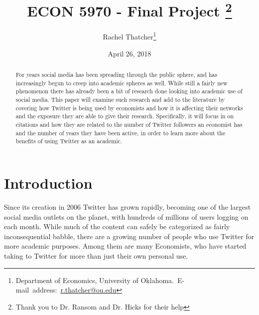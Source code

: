 \documentclass[12pt, Times New Roman]{article}
\begin{document}
\begin{singlespace}
\title{ECON 5970 - Final Project \thanks{Thank you to Dr. Ransom and Dr. Hicks for their help}}
\end{singlespace}

\author{Rachel Thatcher\thanks{Department of Economics, University of Oklahoma.\
E-mail~address:~\href{mailto:r.thatcher@ou.edu}{r.thatcher@ou.edu}}}

\date{April 26, 2018}

\maketitle

\begin{abstract}
\begin{singlespace}
For years social media has been spreading through the public sphere, and has increasingly begun to creep into academic spheres as well. While still a fairly new phenomenon there has already been a bit of research done looking into academic use of social media. This paper will examine such research and add to the literature by covering how Twitter is being used by economists and how it is affecting their networks and the exposure they are able to give their research. Specifically, it will focus in on citations and how they are related to the number of Twitter followers an economist has and the number of years they have been active, in order to learn more about the benefits of using Twitter as an academic.  

\end{singlespace}

\end{abstract}
\vfill{}


\pagebreak{}


\section*{Introduction}\label{sec:intro}
\setlength{\parindent}{10ex}


Since its creation in 2006 Twitter has grown rapidly, becoming one of the largest social media outlets on the planet, with hundreds of millions of users logging on each month. While much of the content can safely be categorized as fairly inconsequential babble, there are a growing number of people who use Twitter for more academic purposes. Among them are many Economists, who have started taking to Twitter for more than just their own personal use. 
\end{document}
